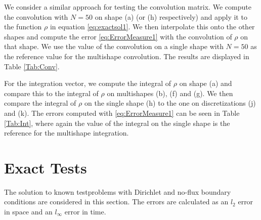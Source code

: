 \documentclass[11pt, a4paper]{article}
\theoremstyle{definition}
\begin{document}
We consider a similar approach for testing the convolution matrix. We compute the convolution with $N = 50$ on shape (a) (or (h) respectively) and apply it to the function $\rho$ in equation \eqref{eq:exactsol1}. We then interpolate this onto the other shapes and compute the error \eqref{eq:ErrorMeasure1} with the convolution of $\rho$ on that shape. We use the value of the convolution on a single shape with $N = 50$ as the reference value for the multishape convolution. The results are displayed in Table \ref{Tab:Conv}.

For the integration vector, we compute the integral of $\rho$ on shape (a) and compare this to the integral of $\rho$ on multishapes (b), (f) and (g). We then compare the integral of $\rho$ on the single shape (h) to the one on discretizations (j) and (k). The errors computed with \eqref{eq:ErrorMeasure1} can be seen in Table \ref{Tab:Int}, where again the value of the integral on the single shape is the reference for the multishape integration.







\section{Exact Tests}
The solution to known testproblems with Dirichlet and no-flux boundary conditions are considered in this section. The errors are calculated as an $l_2$ error in space and an $l_\infty$ error in time.
\end{document}
